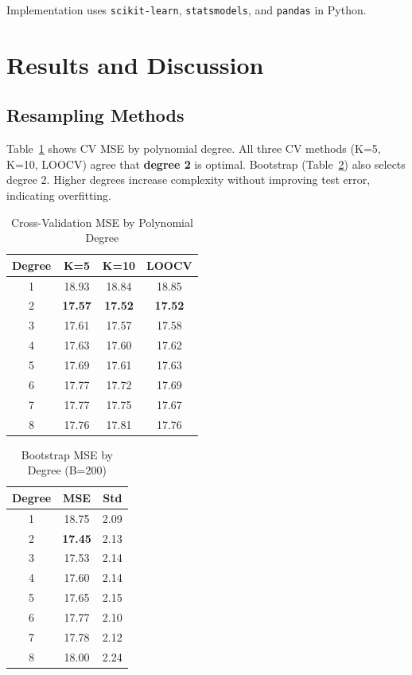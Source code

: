 \documentclass[conference]{IEEEtran}
\begin{document}
Implementation uses \texttt{scikit-learn}, \texttt{statsmodels}, and \texttt{pandas} in Python.

\section{Results and Discussion}
\label{sec:results}

\subsection{Resampling Methods}
\label{sec:resampling_results}

Table~\ref{tab:cv_mse} shows CV MSE by polynomial degree. All three CV methods (K=5, K=10, LOOCV) agree that \textbf{degree 2} is optimal. Bootstrap (Table~\ref{tab:bootstrap}) also selects degree 2. Higher degrees increase complexity without improving test error, indicating overfitting.

\begin{table}[htbp]
\caption{Cross-Validation MSE by Polynomial Degree}
\label{tab:cv_mse}
\begin{center}
\begin{tabular}{|c|c|c|c|}
\hline
\textbf{Degree} & \textbf{K=5} & \textbf{K=10} & \textbf{LOOCV} \\
\hline
1 & 18.93 & 18.84 & 18.85 \\
2 & \textbf{17.57} & \textbf{17.52} & \textbf{17.52} \\
3 & 17.61 & 17.57 & 17.58 \\
4 & 17.63 & 17.60 & 17.62 \\
5 & 17.69 & 17.61 & 17.63 \\
6 & 17.77 & 17.72 & 17.69 \\
7 & 17.77 & 17.75 & 17.67 \\
8 & 17.76 & 17.81 & 17.76 \\
\hline
\end{tabular}
\end{center}
\end{table}

\begin{table}[htbp]
\caption{Bootstrap MSE by Degree (B=200)}
\label{tab:bootstrap}
\begin{center}
\begin{tabular}{|c|c|c|}
\hline
\textbf{Degree} & \textbf{MSE} & \textbf{Std} \\
\hline
1 & 18.75 & 2.09 \\
2 & \textbf{17.45} & 2.13 \\
3 & 17.53 & 2.14 \\
4 & 17.60 & 2.14 \\
5 & 17.65 & 2.15 \\
6 & 17.77 & 2.10 \\
7 & 17.78 & 2.12 \\
8 & 18.00 & 2.24 \\
\hline
\end{tabular}
\end{center}
\end{table}
\end{document}
